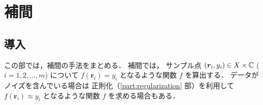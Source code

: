 %

\part{補間}

\chapter{導入}

この部では，補間の手法をまとめる．
補間では，
サンプル点 $(\bm{r}_i, y_i) \in X \times \mathbb{C}$ ($i = 1, 2, \ldots, m$) について
$f(\bm{r}_i) = y_i$
となるような関数 $f$ を算出する．
データがノイズを含んでいる場合は
正則化（\ref{part:regularization} 部）を利用して
$f(\bm{r}_i) \approx y_i$
となるような関数 $f$ を求める場合もある．


